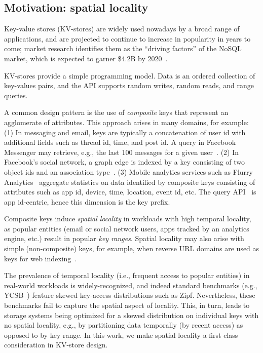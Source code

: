 \subsection{Motivation: spatial locality} 
Key-value stores (KV-stores) are widely used nowadays by a broad range of applications, and are projected
to continue to increase in popularity in years to come; market research  identifies them as the 
``driving factors'' of the NoSQL market, which is expected to garner \$4.2B by 2020~\cite{alliedmarketresearch}.

KV-stores provide a simple programming model. 
Data is an ordered collection of key-values pairs, and  the API supports random writes, 
random reads, and range queries. 

A common design pattern is the use of \emph{composite} 
keys that represent an agglomerate of attributes.
This approach arises in many domains, for example: 
(1) In messaging and email, keys are typically a concatenation of user id with additional fields 
such as thread id, time, and post id. A query in Facebook Messenger may retrieve, e.g., the last 100 messages for a 
given user~\cite{Borthakur:2011:AHG:1989323.1989438}. %
(2) In Facebook's social network, a graph edge is indexed by a key consisting of two 
object ids and an association type~\cite{Armstrong:2013:LDB:2463676.2465296}.
(3) Mobile analytics services such as Flurry Analytics~\cite{flurry} aggregate statistics 
on data identified by composite keys consisting of attributes such as app id, device, time, location, 
event id, etc. The query API~\cite{flurry-api} is app id-centric, hence this dimension is the key prefix.

Composite keys induce \emph{spatial locality} in workloads with high {temporal locality}, as 
popular entities (email or social network users, apps tracked by an analytics engine, etc.) result in popular \emph{key ranges}. 
Spatial locality may also arise with simple (non-composite) keys, for example, when 
reverse  URL domains are used as keys for web  indexing~\cite{Cho:1998:ECT:297805.297835}. 

The prevalence of temporal locality (i.e., frequent access to popular entities) in real-world workloads is widely-recognized, 
and indeed standard benchmarks (e.g., YCSB~\cite{YCSB})  feature skewed key-access distributions such as Zipf.
Nevertheless, 
these benchmarks fail to capture the spatial aspect of locality.
This, in turn, leads to storage systems being optimized for a skewed distribution on individual keys with no spatial locality,
e.g., by partitioning data temporally (by recent access) as opposed to by key range.
In this work, we make spatial locality a first class consideration in KV-store design.


